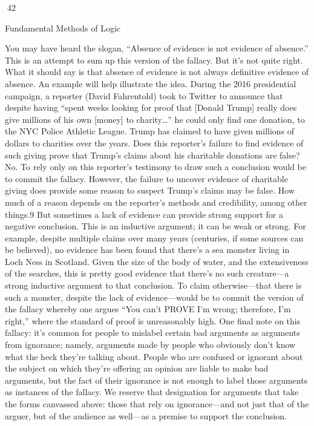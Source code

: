 42

Fundamental Methods of Logic

You may have heard the slogan, “Absence of evidence is not evidence of absence.” This is an
attempt to sum up this version of the fallacy. But it’s not quite right. What it should say is that
absence of evidence is not always definitive evidence of absence. An example will help illustrate
the idea. During the 2016 presidential campaign, a reporter (David Fahrentold) took to Twitter to
announce that despite having “spent weeks looking for proof that [Donald Trump] really does give
millions of his own [money] to charity…” he could only find one donation, to the NYC Police
Athletic League. Trump has claimed to have given millions of dollars to charities over the years.
Does this reporter’s failure to find evidence of such giving prove that Trump’s claims about his
charitable donations are false? No. To rely only on this reporter’s testimony to draw such a
conclusion would be to commit the fallacy.
However, the failure to uncover evidence of charitable giving does provide some reason to suspect
Trump’s claims may be false. How much of a reason depends on the reporter’s methods and
credibility, among other things.9 But sometimes a lack of evidence can provide strong support for
a negative conclusion. This is an inductive argument; it can be weak or strong. For example,
despite multiple claims over many years (centuries, if some sources can be believed), no evidence
has been found that there’s a sea monster living in Loch Ness in Scotland. Given the size of the
body of water, and the extensiveness of the searches, this is pretty good evidence that there’s no
such creature—a strong inductive argument to that conclusion. To claim otherwise—that there is
such a monster, despite the lack of evidence—would be to commit the version of the fallacy
whereby one argues “You can’t PROVE I’m wrong; therefore, I’m right,” where the standard of
proof is unreasonably high.
One final note on this fallacy: it’s common for people to mislabel certain bad arguments as
arguments from ignorance; namely, arguments made by people who obviously don’t know what
the heck they’re talking about. People who are confused or ignorant about the subject on which
they’re offering an opinion are liable to make bad arguments, but the fact of their ignorance is not
enough to label those arguments as instances of the fallacy. We reserve that designation for
arguments that take the forms canvassed above: those that rely on ignorance—and not just that of
the arguer, but of the audience as well—as a premise to support the conclusion.

